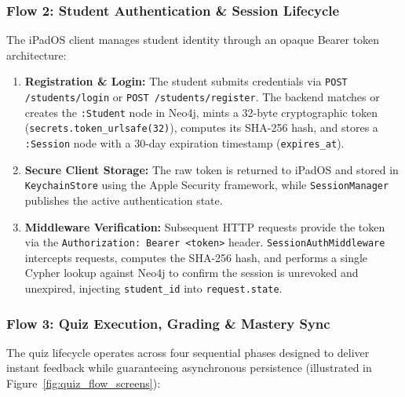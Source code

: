 \subsubsection*{Flow 2: Student Authentication \& Session Lifecycle}

The iPadOS client manages student identity through an opaque Bearer token architecture:

\begin{sloppypar}
\begin{enumerate}
    \item \textbf{Registration \& Login:} The student submits credentials via \texttt{POST /students/login} or \texttt{POST /students/register}. The backend matches or creates the \texttt{:Student} node in Neo4j, mints a 32-byte cryptographic token (\texttt{secrets.token\_urlsafe(32)}), computes its SHA-256 hash, and stores a \texttt{:Session} node with a 30-day expiration timestamp (\texttt{expires\_at}).
    \item \textbf{Secure Client Storage:} The raw token is returned to iPadOS and stored in \texttt{KeychainStore} using the Apple Security framework, while \texttt{SessionManager} publishes the active authentication state.
    \item \textbf{Middleware Verification:} Subsequent HTTP requests provide the token via the \texttt{Authorization:}\allowbreak\ \texttt{Bearer <token>} header. \texttt{SessionAuthMiddleware} intercepts requests, computes the SHA-256 hash, and performs a single Cypher lookup against Neo4j to confirm the session is unrevoked and unexpired, injecting \texttt{student\_id} into \texttt{request.state}.
\end{enumerate}
\end{sloppypar}

\subsubsection*{Flow 3: Quiz Execution, Grading \& Mastery Sync}

The quiz lifecycle operates across four sequential phases designed to deliver instant feedback while guaranteeing asynchronous persistence (illustrated in Figure~\ref{fig:quiz_flow_screens}):

